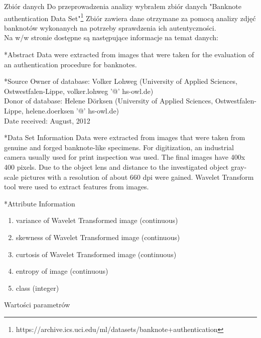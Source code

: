 \documentclass[a4paper]{article}
\begin{document}
\begin{section}{Zbiór danych}
				Do przeprowadzenia analizy wybrałem zbiór danych "Banknote authentication Data Set"\footnote{https://archive.ics.uci.edu/ml/datasets/banknote+authentication} Zbiór zawiera dane otrzymane za pomocą analizy zdjęć banknotów wykonanych na potrzeby sprawdzenia ich autentyczności.\\
Na w/w stronie dostępne są następujące informacje na temat danych:\\
\begin{subsection}*{Abstract}
				Data were extracted from images that were taken for the evaluation of an authentication procedure for banknotes.
\end{subsection}
\begin{subsection}*{Source}
Owner of database: Volker Lohweg (University of Applied Sciences, Ostwestfalen-Lippe, volker.lohweg '@' hs-owl.de)\\
Donor of database: Helene Dörksen (University of Applied Sciences, Ostwestfalen-Lippe, helene.doerksen '@' hs-owl.de)\\
Date received: August, 2012
\end{subsection}
\begin{subsection}*{Data Set Information}
Data were extracted from images that were taken from genuine and forged banknote-like specimens. For digitization, an industrial camera usually used for print inspection was used. The final images have 400x 400 pixels. Due to the object lens and distance to the investigated object gray-scale pictures with a resolution of about 660 dpi were gained. Wavelet Transform tool were used to extract features from images.
\end{subsection}
\begin{subsection}*{Attribute Information}
		\begin{enumerate}
				\item variance of Wavelet Transformed image (continuous)
				\item skewness of Wavelet Transformed image (continuous)
				\item curtosis of Wavelet Transformed image (continuous)
				\item entropy of image (continuous)
				\item class (integer)
		\end{enumerate}
\end{subsection}
\begin{subsection}{Wartości parametrów}


\end{subsection}
\end{section}
\end{document}
